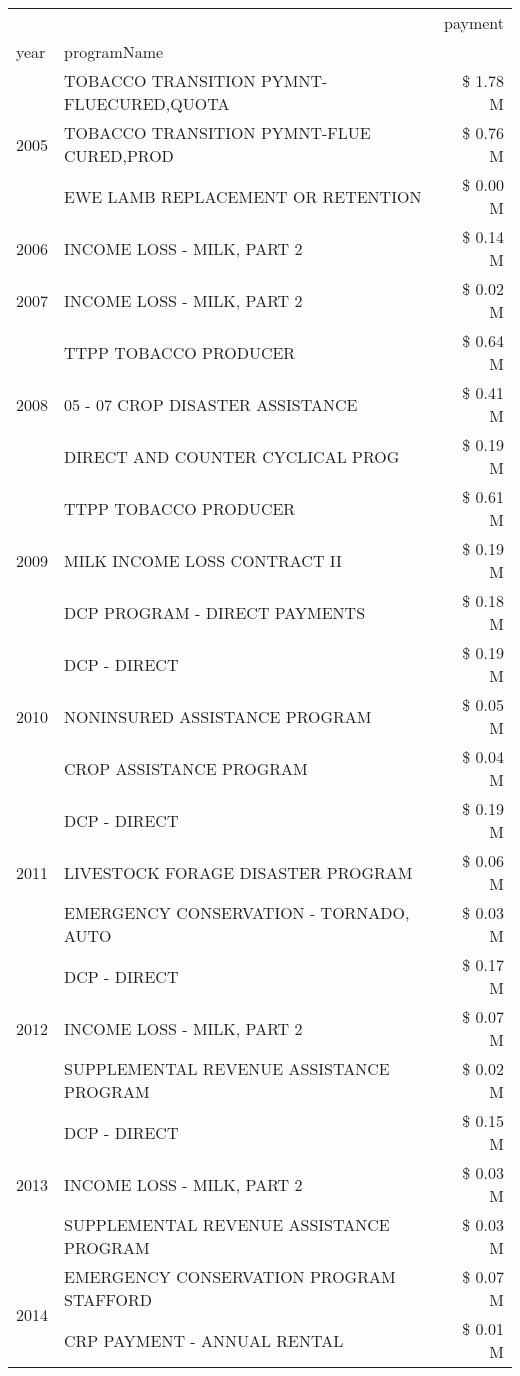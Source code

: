 \begin{tabular}{llr}
\toprule
 &  & payment \\
year & programName &  \\
\midrule
\multirow[t]{3}{*}{2005} & TOBACCO TRANSITION PYMNT-FLUECURED,QUOTA & \$ 1.78 M \\
 & TOBACCO TRANSITION PYMNT-FLUE CURED,PROD & \$ 0.76 M \\
 & EWE LAMB REPLACEMENT OR RETENTION & \$ 0.00 M \\
\cline{1-3}
2006 & INCOME LOSS - MILK, PART 2 & \$ 0.14 M \\
\cline{1-3}
2007 & INCOME LOSS - MILK, PART 2 & \$ 0.02 M \\
\cline{1-3}
\multirow[t]{3}{*}{2008} & TTPP TOBACCO PRODUCER & \$ 0.64 M \\
 & 05 - 07 CROP DISASTER ASSISTANCE & \$ 0.41 M \\
 & DIRECT AND COUNTER CYCLICAL PROG & \$ 0.19 M \\
\cline{1-3}
\multirow[t]{3}{*}{2009} & TTPP TOBACCO PRODUCER & \$ 0.61 M \\
 & MILK INCOME LOSS CONTRACT II & \$ 0.19 M \\
 & DCP PROGRAM - DIRECT PAYMENTS & \$ 0.18 M \\
\cline{1-3}
\multirow[t]{3}{*}{2010} & DCP - DIRECT & \$ 0.19 M \\
 & NONINSURED ASSISTANCE PROGRAM & \$ 0.05 M \\
 & CROP ASSISTANCE PROGRAM & \$ 0.04 M \\
\cline{1-3}
\multirow[t]{3}{*}{2011} & DCP - DIRECT & \$ 0.19 M \\
 & LIVESTOCK FORAGE DISASTER PROGRAM & \$ 0.06 M \\
 & EMERGENCY CONSERVATION - TORNADO, AUTO & \$ 0.03 M \\
\cline{1-3}
\multirow[t]{3}{*}{2012} & DCP - DIRECT & \$ 0.17 M \\
 & INCOME LOSS - MILK, PART 2 & \$ 0.07 M \\
 & SUPPLEMENTAL REVENUE ASSISTANCE PROGRAM & \$ 0.02 M \\
\cline{1-3}
\multirow[t]{3}{*}{2013} & DCP - DIRECT & \$ 0.15 M \\
 & INCOME LOSS - MILK, PART 2 & \$ 0.03 M \\
 & SUPPLEMENTAL REVENUE ASSISTANCE PROGRAM & \$ 0.03 M \\
\cline{1-3}
\multirow[t]{3}{*}{2014} & EMERGENCY CONSERVATION PROGRAM STAFFORD & \$ 0.07 M \\
 & CRP PAYMENT - ANNUAL RENTAL & \$ 0.01 M \\

\end{tabular}
